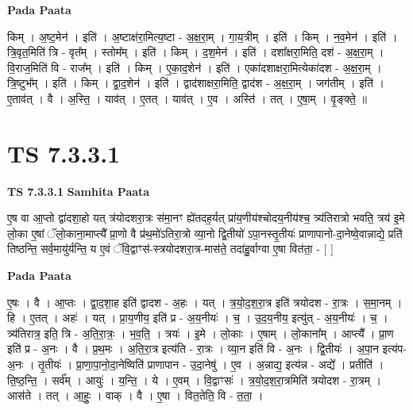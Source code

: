 \documentclass[17pt]{extarticle}
\begin{document}
\textbf{Pada Paata} \newline

किम् । अ॒ष्ट॒मेन॑ । इति॑ । अ॒ष्टाक्ष॑रा॒मित्य॒ष्टा - अ॒क्ष॒रा॒म् । गा॒य॒त्रीम् । इति॑ । किम् । न॒व॒मेन॑ । इति॑ । त्रि॒वृत॒मिति॑ त्रि - वृत᳚म् । स्तोम᳚म् । इति॑ । किम् । द॒श॒मेन॑ । इति॑ । दशा᳚क्षरा॒मिति॒ दश॑ - अ॒क्ष॒रा॒म् । वि॒राज॒मिति॑ वि - राज᳚म् । इति॑ । किम् । ए॒का॒द॒शेन॑ । इति॑ । एका॑दशाक्षरा॒मित्येका॑दश - अ॒क्ष॒रा॒म् । त्रि॒ष्टुभ᳚म् । इति॑ । किम् । द्वा॒द॒शेन॑ । इति॑ । द्वाद॑शाक्षरा॒मिति॒ द्वाद॑श - अ॒क्ष॒रा॒म् । जग॑तीम् । इति॑ । ए॒ताव॑त् । वै । अ॒स्ति॒ । याव॑त् । ए॒तत् । याव॑त् । ए॒व । अस्ति॑ । तत् । ए॒षा॒म् । वृ॒ङ्क्ते॒ ॥  \newline





\section{ TS 7.3.3.1 }

\textbf{TS 7.3.3.1 } \newline
\textbf{Samhita Paata} \newline

ए॒ष वा आ॒प्तो द्वा॑दशा॒हो यत् त्र॑योदशरा॒त्रः स॑मा॒नꣳ ह्ये॑तदह॒र्यत् प्रा॑य॒णीय॑श्चोदय॒नीय॑श्च॒ त्र्य॑तिरात्रो भवति॒ त्रय॑ इ॒मे लो॒का ए॒षां ॅलो॒काना॒माप्त्यै᳚ प्रा॒णो वै प्र॑थ॒मो॑ऽतिरा॒त्रो व्या॒नो द्वि॒तीयो॑ ऽपा॒नस्तृ॒तीयः॑ प्राणापानो-दा॒नेष्वे॒वान्नाद्ये॒ प्रति॑ तिष्ठन्ति॒ सर्व॒मायु॑र्यन्ति॒ य ए॒वं ॅवि॒द्वाꣳस॑-स्त्रयोदशरा॒त्र-मास॑ते॒ तदा॑हु॒र्वाग्वा ए॒षा वित॑ता॒ - [  ] \newline

\textbf{Pada Paata} \newline

ए॒षः । वै । आ॒प्तः । द्वा॒द॒शा॒ह इति॑ द्वादश - अ॒हः । यत् । त्र॒यो॒द॒श॒रा॒त्र इति॑ त्रयोदश - रा॒त्रः । स॒मा॒नम् । हि । ए॒तत् । अहः॑ । यत् । प्रा॒य॒णीय॒ इति॑ प्र - अ॒य॒नीयः॑ । च॒ । उ॒द॒य॒नीय॒ इत्यु॑त् - अ॒य॒नीयः॑ । च॒ । त्र्य॑तिरात्र॒ इति॒ त्रि - अ॒ति॒रा॒त्रः॒ । भ॒व॒ति॒ । त्रयः॑ । इ॒मे । लो॒काः । ए॒षाम् । लो॒काना᳚म् । आप्त्यै᳚ । प्रा॒ण इति॑ प्र - अ॒नः । वै । प्र॒थ॒मः । अ॒ति॒रा॒त्र इत्य॑ति - रा॒त्रः । व्या॒न इति॑ वि - अ॒नः । द्वि॒तीयः॑ । अ॒पा॒न इत्य॑प-अ॒नः । तृ॒तीयः॑ । प्रा॒णा॒पा॒नो॒दा॒नेष्विति॑ प्राणापान - उ॒दा॒नेषु॑ । ए॒व । अ॒न्नाद्य॒ इत्य॑न्न - अद्ये᳚ । प्रतीति॑ । ति॒ष्ठ॒न्ति॒ । सर्व᳚म् । आयुः॑ । य॒न्ति॒ । ये । ए॒वम् । वि॒द्वाꣳसः॑ । त्र॒यो॒द॒श॒रा॒त्रमिति॑ त्रयोदश - रा॒त्रम् । आस॑ते । तत् । आ॒हुः॒ । वाक् । वै । ए॒षा । वित॒तेति॒ वि - त॒ता॒ ।  \newline
\end{document}
